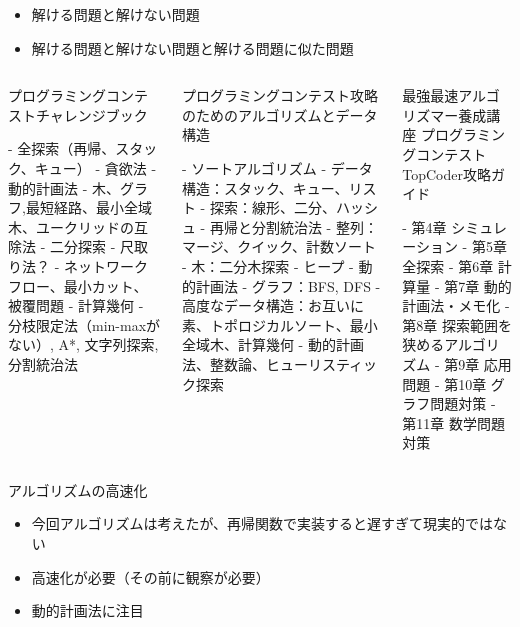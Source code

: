 \documentclass{beamer}
\begin{document}
\begin{frame}[fragile]{}{}
\begin{itemize}\itemsep8pt
\item 解ける問題と解けない問題
\item 解ける問題と解けない問題と解ける問題に似た問題
\end{itemize}

\vfill
{\fontsize{4}{6}\selectfont
\begin{columns}[T]
\begin{column}{0.3\textwidth}
プログラミングコンテストチャレンジブック
\begin{markdown}
- 全探索（再帰、スタック、キュー）
- 貪欲法
- 動的計画法
- 木、グラフ,最短経路、最小全域木、ユークリッドの互除法
- 二分探索
- 尺取り法？
- ネットワークフロー、最小カット、被覆問題
- 計算幾何
- 分枝限定法（min-maxがない）, A*, 文字列探索, 分割統治法
\end{markdown}
\end{column}
\begin{column}{0.3\textwidth}
プログラミングコンテスト攻略のためのアルゴリズムとデータ構造
\begin{markdown}
- ソートアルゴリズム
- データ構造：スタック、キュー、リスト
- 探索：線形、二分、ハッシュ
- 再帰と分割統治法
- 整列：マージ、クイック、計数ソート
- 木：二分木探索
- ヒープ
- 動的計画法
- グラフ：BFS, DFS
- 高度なデータ構造：お互いに素、トポロジカルソート、最小全域木、計算幾何
- 動的計画法、整数論、ヒューリスティック探索
\end{markdown}
\end{column}
\begin{column}{0.3\textwidth}
最強最速アルゴリズマー養成講座 プログラミングコンテストTopCoder攻略ガイド
\begin{markdown}
- 第4章 シミュレーション
- 第5章 全探索
- 第6章 計算量
- 第7章 動的計画法・メモ化
- 第8章 探索範囲を狭めるアルゴリズム
- 第9章 応用問題
- 第10章 グラフ問題対策
- 第11章 数学問題対策
\end{markdown}
\end{column}
\end{columns}
}
\end{frame}

\begin{frame}[fragile]{アルゴリズムの高速化}{}
\begin{itemize}\itemsep20pt
\item 今回アルゴリズムは考えたが、再帰関数で実装すると遅すぎて現実的ではない
\item 高速化が必要（その前に観察が必要）
\item 動的計画法に注目
\end{itemize}
\end{frame}
\end{document}
